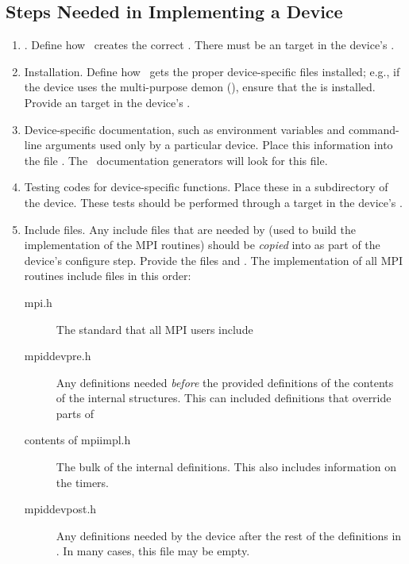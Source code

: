 \subsection{Steps Needed in Implementing a Device}
\begin{enumerate}
\item {}.  Define how \mpich\ creates the correct
.  There must be an  target in the
device's .

\item Installation.  Define how \mpich\ gets the proper device-specific files
  installed; e.g., if the device uses the multi-purpose demon
  (), ensure that the  is installed.  Provide an
   target in the device's .

\item Device-specific documentation, such as environment variables and
  command-line arguments used only by a particular device.  Place this
  information into the file .  The \mpich\
  documentation generators will look for this file.

\item Testing codes for device-specific functions.  Place these
in a  subdirectory of the device. These tests 
should be performed through a  target in the device's
\file{Makefile}. 

\item Include files.  Any include files that are needed by
 (used to build the implementation of the MPI
routines) should be \emph{copied} into  as
part of the device's configure step.  Provide the files
 and .  The implementation of all MPI
routines include files in this order:
\begin{description}
\item[mpi.h]The standard  that all MPI users include
\item[mpiddevpre.h]Any definitions needed \emph{before} the provided
definitions of the contents of the internal structures.  This can
included definitions that override parts of \file{mpiimpl.h}
\item[contents of mpiimpl.h]The bulk of the internal definitions.
This also includes information on the timers.
\item[mpiddevpost.h]Any definitions needed by the device after the rest
of the definitions in \file{mpiimpl.h}.  In many cases, this file may
be empty.
\end{description}
\end{enumerate}

